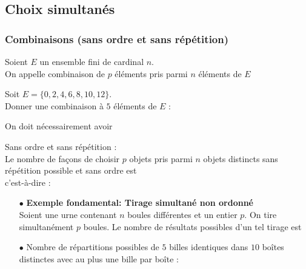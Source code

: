 \documentclass[a4paper, 11pt]{article}
\begin{document}
\subsection{Choix simultan\'es}


\subsubsection{Combinaisons (sans ordre et sans r\'ep\'etition)}



\begin{defi}  
Soient $E$ un ensemble fini de cardinal $n$.\\
\noindent  On appelle combinaison de $p$ \'el\'ements pris parmi $n$ \'el\'ements de $E$ \dotfill \\
\noindent \phantom{ \hspace{-0.1cm}}\dotfill \vsec
\end{defi}
 



\begin{exemple} 
Soit $E=\lbrace 0,2,4,6,8,10,12\rbrace$. \\
Donner une combinaison \`a $5$ \'el\'ements de $E$ : \dotfill 
\end{exemple}


\begin{rem}
On doit n\'ecessairement avoir \dotfill
\end{rem}




\begin{prop} Sans ordre et sans r\'ep\'etition :\\
Le nombre de fa\c{c}ons de choisir $p$ objets pris parmi $n$ objets distincts sans r\'ep\'etition possible et sans ordre est \dotfill\\
c'est-\`a-dire :\vsec\vsec
\end{prop}





\noindent  \begin{exemples} 
\begin{itemize}
\item[$\bullet$] \textbf{Exemple fondamental: Tirage simultan\'e non ordonn\'e}\\
\noindent Soient une urne contenant $n$ boules diff\'erentes et un entier $p$. On tire simultan\'ement $p$ boules. Le nombre de r\'esultats possibles d'un tel tirage est \dotfill\vsec
\item[$\bullet$] Nombre de r\'epartitions possibles de $5$ billes identiques dans $10$ bo\^{i}tes distinctes avec au plus une bille par bo\^{i}te : \dotfill\vsec
\end{itemize}
\end{exemples}
\end{document}
